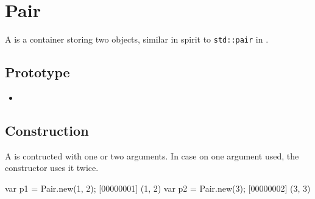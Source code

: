 \section{Pair}

A  is a container storing two objects, similar in spirit to
\lstinline|std::pair| in \Cxx.

\subsection{Prototype}
\begin{itemize}
\item {}
\end{itemize}

\subsection{Construction}

A  is contructed with one or two arguments. In case on one
argument used, the constructor uses it twice.

\begin{urbiscript}
var p1 = Pair.new(1, 2);
[00000001] (1, 2)
var p2 = Pair.new(3);
[00000002] (3, 3)
\end{urbiscript}


